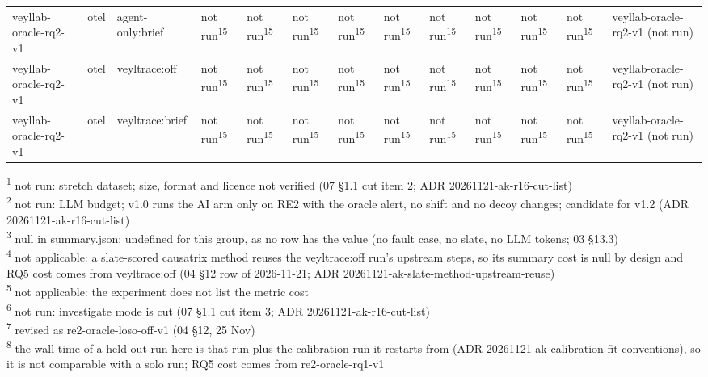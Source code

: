 \begin{table}[t]
\begin{tabular}{lllllllllllll}
veyllab-oracle-rq2-v1 & otel & agent-only:brief & not run\textsuperscript{15} & not run\textsuperscript{15} & not run\textsuperscript{15} & not run\textsuperscript{15} & not run\textsuperscript{15} & not run\textsuperscript{15} & not run\textsuperscript{15} & not run\textsuperscript{15} & not run\textsuperscript{15} & veyllab-oracle-rq2-v1 (not run) \\
veyllab-oracle-rq2-v1 & otel & veyltrace:off & not run\textsuperscript{15} & not run\textsuperscript{15} & not run\textsuperscript{15} & not run\textsuperscript{15} & not run\textsuperscript{15} & not run\textsuperscript{15} & not run\textsuperscript{15} & not run\textsuperscript{15} & not run\textsuperscript{15} & veyllab-oracle-rq2-v1 (not run) \\
veyllab-oracle-rq2-v1 & otel & veyltrace:brief & not run\textsuperscript{15} & not run\textsuperscript{15} & not run\textsuperscript{15} & not run\textsuperscript{15} & not run\textsuperscript{15} & not run\textsuperscript{15} & not run\textsuperscript{15} & not run\textsuperscript{15} & not run\textsuperscript{15} & veyllab-oracle-rq2-v1 (not run) \\
\hline
\end{tabular}
\par\smallskip\footnotesize
\textsuperscript{1} not run: stretch dataset; size, format and licence not verified (07 \S{}1.1 cut item 2; ADR 20261121-ak-r16-cut-list)\\
\textsuperscript{2} not run: LLM budget; v1.0 runs the AI arm only on RE2 with the oracle alert, no shift and no decoy changes; candidate for v1.2 (ADR 20261121-ak-r16-cut-list)\\
\textsuperscript{3} null in summary.json: undefined for this group, as no row has the value (no fault case, no slate, no LLM tokens; 03 \S{}13.3)\\
\textsuperscript{4} not applicable: a slate-scored causatrix method reuses the veyltrace:off run's upstream steps, so its summary cost is null by design and RQ5 cost comes from veyltrace:off (04 \S{}12 row of 2026-11-21; ADR 20261121-ak-slate-method-upstream-reuse)\\
\textsuperscript{5} not applicable: the experiment does not list the metric cost\\
\textsuperscript{6} not run: investigate mode is cut (07 \S{}1.1 cut item 3; ADR 20261121-ak-r16-cut-list)\\
\textsuperscript{7} revised as re2-oracle-loso-off-v1 (04 \S{}12, 25 Nov)\\
\textsuperscript{8} the wall time of a held-out run here is that run plus the calibration run it restarts from (ADR 20261121-ak-calibration-fit-conventions), so it is not comparable with a solo run; RQ5 cost comes from re2-oracle-rq1-v1\\

\end{table}

